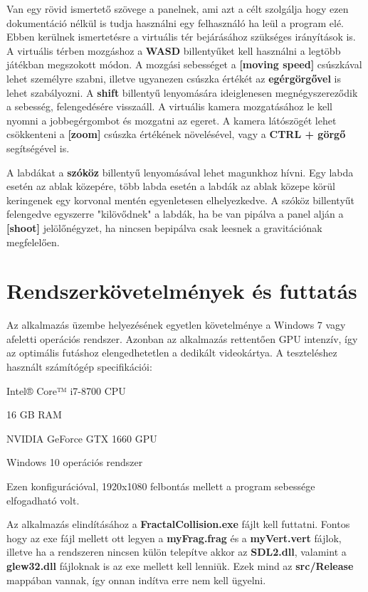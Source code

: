 Van egy rövid ismertető szövege a panelnek, ami azt a célt szolgálja hogy ezen dokumentáció nélkül is tudja használni egy felhasználó ha leül a program elé. Ebben kerülnek ismertetésre a virtuális tér bejárásához szükséges irányítások is. A virtuális térben mozgáshoz a \textbf{WASD} billentyűket kell használni a legtöbb játékban megszokott módon. A mozgási sebességet a \textbf{[moving speed]} csúszkával lehet személyre szabni, illetve ugyanezen csúszka értékét az \textbf{egérgörgővel} is lehet szabályozni. A \textbf{shift} billentyű lenyomására ideiglenesen megnégyszereződik a sebesség, felengedésére visszaáll. A virtuális kamera mozgatásához le kell nyomni a jobbegérgombot és mozgatni az egeret. A kamera látószögét lehet csökkenteni a \textbf{[zoom]} csúszka értékének növelésével, vagy a \textbf{CTRL + görgő} segítségével is.

A labdákat a \textbf{szóköz} billentyű lenyomásával lehet magunkhoz hívni. Egy labda esetén az ablak közepére, több labda esetén a labdák az ablak közepe körül keringenek egy korvonal mentén egyenletesen elhelyezkedve. A szóköz billentyűt felengedve egyszerre "kilövődnek" a labdák, ha be van pipálva a panel alján a \textbf{[shoot]} jelölőnégyzet, ha nincsen bepipálva csak leesnek a gravitációnak megfelelően.
 
\cleardoublepage
\section{Rendszerkövetelmények és futtatás} 
\label{sec:futtatas} 
Az alkalmazás üzembe helyezésének egyetlen követelménye a Windows 7 vagy afeletti operációs rendszer. Azonban az alkalmazás rettentően GPU intenzív, így az optimális futáshoz elengedhetetlen a dedikált videokártya. A teszteléshez használt számítógép specifikációi:
\begin{compactitem}
	\item Intel® Core™ i7-8700 CPU
	\item 16 GB RAM
	\item NVIDIA GeForce GTX 1660 GPU
	\item Windows 10 operációs rendszer
\end{compactitem}
Ezen konfigurációval, 1920x1080 felbontás mellett a program sebessége elfogadható volt.

Az alkalmazás elindításához a \textbf{FractalCollision.exe} fájlt kell futtatni. Fontos hogy az exe fájl mellett ott legyen a \textbf{myFrag.frag} és a \textbf{myVert.vert} fájlok, illetve ha a rendszeren nincsen külön telepítve akkor az \textbf{SDL2.dll}, valamint a \textbf{glew32.dll} fájloknak is az exe mellett kell lenniük. Ezek mind az \textbf{src/Release} mappában vannak, így onnan indítva erre nem kell ügyelni.

